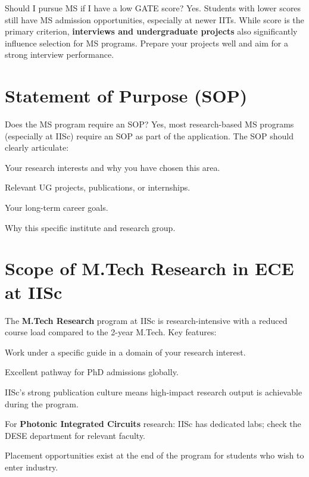 \begin{faqentry}{Should I pursue MS if I have a low GATE score?}
  Yes. Students with lower \GATE scores still have MS admission opportunities,
  especially at newer IITs. While \GATE score is the primary criterion,
  \textbf{interviews and undergraduate projects} also significantly influence
  selection for MS programs. Prepare your projects well and aim for a strong
  interview performance.
\end{faqentry}

\section{Statement of Purpose (SOP)}
\label{sec:sop}

\begin{faqentry}{Does the MS program require an SOP?}
  Yes, most research-based MS programs (especially at IISc) require an SOP as
  part of the application. The SOP should clearly articulate:
  \begin{pfChecklist}
    \item Your research interests and why you have chosen this area.
    \item Relevant UG projects, publications, or internships.
    \item Your long-term career goals.
    \item Why this specific institute and research group.
  \end{pfChecklist}
\end{faqentry}

\section{Scope of M.Tech Research in ECE at IISc}
\label{sec:iisc-research}

The \textbf{M.Tech Research} program at IISc is research-intensive with a
reduced course load compared to the 2-year M.Tech. Key features:

\begin{pfChecklist}
  \item Work under a specific guide in a domain of your research interest.
  \item Excellent pathway for PhD admissions globally.
  \item IISc's strong publication culture means high-impact research output
        is achievable during the program.
  \item For \textbf{Photonic Integrated Circuits} research: IISc has dedicated
        labs; check the DESE department for relevant faculty.
  \item Placement opportunities exist at the end of the program for students
        who wish to enter industry.
\end{pfChecklist}
